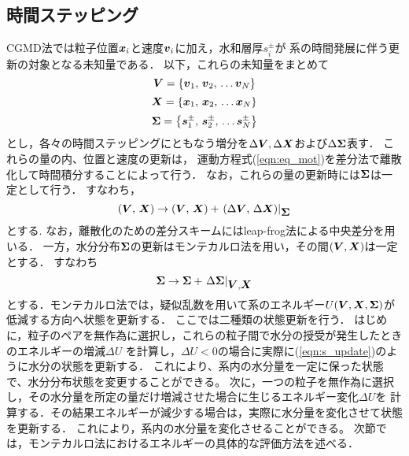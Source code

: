 \subsection{時間ステッピング}
CGMD法では粒子位置$\mbox{\boldmath $x$}_i$と速度$\mbox{\boldmath $v$}_i$に加え，水和層厚$s_i^\pm$が
系の時間発展に伴う更新の対象となる未知量である．
以下，これらの未知量をまとめて
\begin{equation}
	\mbox{\boldmath $V$}=\left\{ \mbox{\boldmath $v$}_1,\, \mbox{\boldmath $v$}_2,\, \dots \mbox{\boldmath $v$}_N \right\}
	\label{eqn:defV}
\end{equation}
\begin{equation}
	\mbox{\boldmath $X$}=\left\{ \mbox{\boldmath $x$}_1,\, \mbox{\boldmath $x$}_2,\, \dots \mbox{\boldmath $x$}_N \right\}
	\label{eqn:defV}
\end{equation}
\begin{equation}
	\mbox{\boldmath $\Sigma$}=\left\{ \mbox{\boldmath $s$}_1^\pm,\, \mbox{\boldmath $s$}_2^\pm,\, \dots \mbox{\boldmath $s$}_N^\pm \right\}
	\label{eqn:defV}
\end{equation}
とし，各々の時間ステッピングにともなう増分を$\Delta \mbox{\boldmath $V$},\Delta \mbox{\boldmath $X$}$および$\Delta \mbox{\boldmath $\Sigma$}$表す．
これらの量の内、位置と速度の更新は，
運動方程式(\ref{eqn:eq_mot})を差分法で離散化して時間積分することによって行う．
なお，これらの量の更新時には$\mbox{\boldmath $\Sigma$}$は一定として行う．
すなわち，
\begin{equation}
	\left( \mbox{\boldmath $V$},\,\mbox{\boldmath $X$} \right)
	\rightarrow 
	\left( \mbox{\boldmath $V$},\,\mbox{\boldmath $X$} \right)
	+
	\left. \left( \Delta \mbox{\boldmath $V$},\, \Delta \mbox{\boldmath $X$} \right) \right|_{\mbox{\boldmath $\Sigma$}}
	\label{eqn:vx_update}
\end{equation}
とする. なお，離散化のための差分スキームにはleap-frog法による中央差分を用いる．
一方，水分分布$\mbox{\boldmath $\Sigma$}$の更新はモンテカルロ法を用い，その間$(\mbox{\boldmath $V$},\mbox{\boldmath $X$})$は一定とする．
すなわち
\begin{equation}
	\mbox{\boldmath $\Sigma$} \rightarrow \mbox{\boldmath $\Sigma$} + \left. \Delta \mbox{\boldmath $\Sigma$} \right|_{\mbox{\boldmath $V$},\mbox{\boldmath $X$}}
	\label{eqn:s_update}
\end{equation}
とする．モンテカルロ法では，疑似乱数を用いて系のエネルギー$U(\mbox{\boldmath $V$},\mbox{\boldmath $X$},\mbox{\boldmath $\Sigma$})$が低減する方向へ状態を更新する．
ここでは二種類の状態更新を行う．
はじめに，粒子のペアを無作為に選択し，これらの粒子間で水分の授受が発生したときのエネルギーの増減$\Delta U$
を計算し，$\Delta U<0$の場合に実際に(\ref{eqn:s_update})のように水分の状態を更新する．
これにより、系内の水分量を一定に保った状態で、水分分布状態を変更することができる。
次に，一つの粒子を無作為に選択し，その水分量を所定の量だけ増減させた場合に生じるエネルギー変化$\Delta U$を
計算する．その結果エネルギーが減少する場合は，実際に水分量を変化させて状態を更新する．
これにより，系内の水分量を変化させることができる。
次節では，モンテカルロ法におけるエネルギーの具体的な評価方法を述べる．
